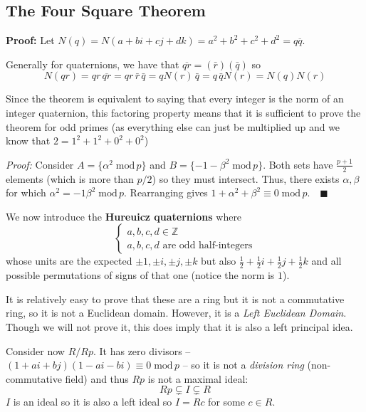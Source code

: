 \documentclass[12pt]{report}
\newcommand{\qed}{\quad \blacksquare}
\newcommand{\Z}{\mathbb{Z}}
\renewcommand{\mod}{\; \text{mod}\, }
\newenvironment*{tbox}[3][breakable]{
    \begin{tcolorbox}[
        parbox=false,
        colback=#2!5!white,
        colframe=#2!75!black,
        title={#3},
        #1
    ]}
    {\end{tcolorbox}}
\begin{document}
    \subsection*{The Four Square Theorem}
        \begin{tbox}{gray}{\textbf{Theorem:} Every positive integer is the sum of four squares}
            \textbf{Proof:} Let $N(q) = N(a + bi + cj + dk) = a^2 + b^2 + c^2 + d^2 = q\overline{q}$. 

            Generally for quaternions, we have that $\overline{qr} = (\bar r)(\bar q)$ so 
            \[N(qr)  = qr\, \overline{qr} = qr \, \bar r\, \bar q = q N(r)\, \bar q = q\, \bar q N(r) = N(q)N(r)\] 

            Since the theorem is equivalent to saying that every integer is the norm of an integer quaternion, this factoring property means that it is sufficient to prove the theorem for odd primes (as everything else can just be multiplied up and we know that $2 = 1^2 + 1^2 + 
            0^2 + 0^2$)

            \begin{tbox}{gray}{\emph{Lemma:} for $p$ an odd prime $\exists \alpha, \beta: 1 + \alpha^2 + \beta^2 \equiv 0 \mod p$. }
                \emph{Proof:} Consider $A = \{\alpha^2 \mod p\}$ and $B = \{-1 - \beta^2 \mod p\}$. Both sets have $\frac{p+1}{2}$ elements (which is more than $p/2$) so they must intersect. Thus, there exists $\alpha, \beta$ for which $\alpha^2 = -1 \beta^2 \mod p$. Rearranging gives $1 + \alpha^2 + \beta^2 \equiv 0 \mod p. \qed$
            \end{tbox}

            We now introduce the \textbf{Hureuicz quaternions} where 
            \[\begin{cases}
                a, b, c, d \in \Z\\ 
                a, b, c, d \text{ are odd half-integers}
            \end{cases}\]
            whose units are the expected $\pm 1, \pm i, \pm j, \pm k$ but also $\frac{1}{2} + \frac{1}{2}i + \frac{1}{2}j + \frac{1}{2}k$ and all possible permutations of signs of that one (notice the norm is $1$). 

            It is relatively easy to prove that these are a ring but it is not a commutative ring, so it is not a Euclidean domain. However, it is a \emph{Left Euclidean Domain}. Though we will not prove it, this does imply that it is also a left principal idea. 

            Consider now $R/Rp$. It has zero divisors -- $(1 + ai + bj)(1 - ai - bi) \equiv 0 \mod p$ -- so it is not a \emph{division ring} (non-commutative field) and thus $Rp$ is not a maximal ideal: 
            \[Rp \subsetneq I \subsetneq R\] 
            $I$ is an ideal so it is also a left ideal so $I = Rc$ for some $c \in R$.


\end{tbox}
\end{document}
